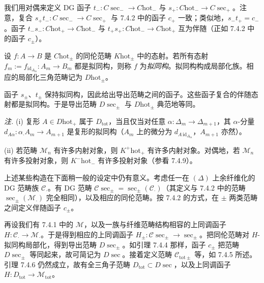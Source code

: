 

我们用对偶来定义 DG 函子 $t_{-}:C\sec_{-}\to C\mathrm{hot}_{-}$ 与 $s_{+}:C\mathrm{hot}_{-}\to C\sec_{+}$。注意，复合 $s_{+}t_{-}:C\sec_{-}\to C\sec_{+}$ 与 7.4.2 中的函子 $c_{+}$ 一致；类似地，$s_{-}t_{+}=c_{-}$。函子 $t_{-}s_{-}:C\mathrm{hot}_{+}\to C\mathrm{hot}_{-}$ 与 $t_{+}s_{+}:C\mathrm{hot}_{-}\to C\mathrm{hot}_{+}$ 互为伴随（正如 7.4.2 中的函子 $c_{\pm}$）。

设 $f:A\to B$ 是 $C\mathrm{hot}_{\pm}$ 的同伦范畴 $K\mathrm{hot}_{\pm}$ 中的态射。若所有态射 $f_{m}:=f_{\mathrm{id}_{\Delta_{m}}}:A_{m}\to B_{m}$ 都是拟同构，则称 $f$ 为\emph{拟同构}。拟同构构成局部化族。相应的局部化三角范畴记为 $D\mathrm{hot}_{\pm}$。

函子 $s_{\pm}$、$t_{\pm}$ 保持拟同构，因此给出导出范畴之间的函子。这些函子复合的伴随态射都是拟同构。于是导出范畴 $D\sec_{\pm}$ 与 $D\mathrm{hot}_{\pm}$ 典范地等同。


\emph{注.} (i) 复形 $A\in D\mathrm{hot}_{+}$ 属于 $D_{\mathrm{tot}}$，当且仅当对任意 $\alpha:\Delta_{m}\to\Delta_{m+1}$，其 $\alpha$-分量 $d_{A\alpha}:\alpha_{\cdot}A_{m}\to A_{m+1}$ 是复形的拟同构（$A_{m}$ 上的微分为 $d_{A\,\mathrm{id}_{\Delta_{m}}}$，$A_{m+1}$ 亦然）。

(ii) 若范畴 $\mathcal{M}_{n}$ 有许多内射对象，则 $K^{+}\mathrm{hot}_{+}$ 有许多内射对象。对偶地，若 $\mathcal{M}_{n}$ 有许多投射对象，则 $K^{-}\mathrm{hot}_{-}$ 有许多投射对象（参看 7.4.9）。

 上述某些构造在下面稍一般的设定中仍有意义。考虑任一在 $(\Delta)$ 上余纤维化的 DG 范畴族 $\mathcal{C}_{\cdot}$。有 DG 范畴 $\mathcal{C}\sec_{\pm}=\sec_{\pm}(\mathcal{C}_{\cdot})$（其定义与 7.4.2 中的范畴 $\sec_{\pm}(\mathcal{M}_{\cdot})$ 完全相同），以及相应的同伦范畴。按 7.4.2 的方式，在 $\pm$ 两类范畴之间定义伴随函子 $c_{\pm}$。

再设我们有 7.4.1 中的 $\mathcal{M}$，以及一族与纤维范畴结构相容的上同调函子 $H:\mathcal{C}_{\cdot}\to\mathcal{M}_{\cdot}$。于是得到相应的上同调函子 $H_{\pm}:\mathcal{C}\sec_{\pm}\to\sec_{\pm}$。把同伦范畴对 $H$-拟同构局部化，得到导出范畴 $D\sec_{\pm}$。如引理 7.4.4 那样，函子 $c_{\pm}$ 把范畴 $D\sec_{\pm}$ 等同起来，故可简记为 $D\sec$。接着定义范畴 $\mathcal{C}_{\mathrm{tot}\pm}$ 等，如 7.4.5 所述。引理 7.4.6 仍然成立，故有全三角子范畴 $D_{\mathrm{tot}}\subset D\sec$，以及上同调函子 $H:D_{\mathrm{tot}}\to\mathcal{M}_{\mathrm{tot}}$。

